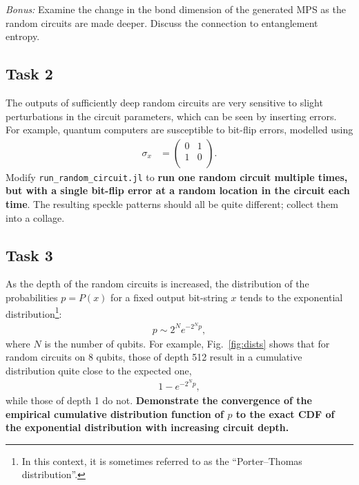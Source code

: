 \documentclass[12pt]{article}
\begin{document}
\medskip \noindent \textit{Bonus:}
Examine the change in the bond dimension of the generated MPS as the random circuits are made deeper.
Discuss the connection to entanglement entropy.


\subsection*{Task 2}

The outputs of sufficiently deep random circuits are very sensitive to slight perturbations in the circuit parameters, which can be seen by inserting errors.
For example, quantum computers are susceptible to bit-flip errors, modelled using
\begin{align}
	\sigma_x
	&= \begin{pmatrix}
			0 & 1 \\
			1 & 0 \\
		\end{pmatrix}.
\end{align}
Modify \texttt{run\_random\_circuit.jl} to \textbf{run one random circuit multiple times, but with a single bit-flip error at a random location in the circuit each time}.
The resulting speckle patterns should all be quite different; collect them into a collage.


\subsection*{Task 3}

As the depth of the random circuits is increased, the distribution of the probabilities $p = P(x)$ for a fixed output bit-string $x$ tends to the exponential distribution\footnote{
	In this context, it is sometimes referred to as the ``Porter--Thomas distribution''.
}:
\begin{align}
	p \sim 2^N e^{-2^N p},
\end{align}
where $N$ is the number of qubits.
For example, Fig.~\ref{fig:dists} shows that for random circuits on 8 qubits, those of depth 512 result in a cumulative distribution quite close to the expected one,
\begin{align}
	1 - e^{-2^N p},
\end{align}
while those of depth 1 do not.
\textbf{Demonstrate the convergence of the empirical cumulative distribution function of $p$ to the exact CDF of the exponential distribution with increasing circuit depth.}
\end{document}
